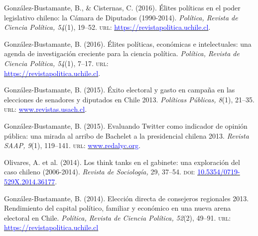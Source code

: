 \begin{publications}
\begin{benumerate}{14}
\item{\small González-Bustamante, B., \& Cisternas, C. (2016). Élites políticas en el poder legislativo chileno: la Cámara de Diputados (1990-2014). {\itshape Política, Revista de Ciencia Política, 54}(1), 19--52. {\scshape url:} \href{https://revistapolitica.uchile.cl/index.php/RP/article/view/42691}{\textcolor{blue}{https://revistapolitica.uchile.cl}}.}\vspace{1mm}

\item{\small González-Bustamante, B. (2016). Élites políticas, económicas e intelectuales: una agenda de investigación creciente para la ciencia política. {\itshape Política, Revista de Ciencia Política, 54}(1), 7--17. {\scshape url:} \\ \href{https://revistapolitica.uchile.cl/index.php/RP/article/view/42690}{\textcolor{blue}{https://revistapolitica.uchile.cl}}.}\vspace{1mm}

\item{\small González-Bustamante, B. (2015). Éxito electoral y gasto en campaña en las elecciones de senadores y diputados en Chile 2013. {\itshape Políticas Públicas, 8}(1), 21--35. {\scshape url:} \href{http://www.revistas.usach.cl/ojs/index.php/politicas/article/view/2182}{\textcolor{blue}{www.revistas.usach.cl}}.} \vspace{1mm}

\item{\small González-Bustamante, B. (2015). Evaluando Twitter como indicador de opinión pública: una mirada al arribo de Bachelet a la presidencial chilena 2013. {\itshape Revista SAAP, 9}(1), 119--141. {\scshape url:} \href{https://www.redalyc.org/articulo.oa?id=387142733006}{\textcolor{blue}{www.redalyc.org}}.} \vspace{1mm}

\item{\small Olivares, A. et al. (2014). Los think tanks en el gabinete: una exploración del caso chileno (2006-2014). {\itshape Revista de Sociología,} 29, 37--54. {\scshape doi}: \href{https://doi.org/10.5354/0719-529X.2014.36177}{\textcolor{blue}{10.5354/0719-529X.2014.36177}}.} \vspace{1mm} %

\item{\small González-Bustamante, B. (2014). Elección directa de consejeros regionales 2013. Rendimiento del capital político, familiar y económico en una nueva arena electoral en Chile. {\itshape Política, Revista de Ciencia Política, 52}(2), 49--91. {\scshape url:} \href{https://revistapolitica.uchile.cl/index.php/RP/article/view/36137}{\textcolor{blue}{https://revistapolitica.uchile.cl}}} \vspace{1mm}


\end{benumerate}
\end{publications}
